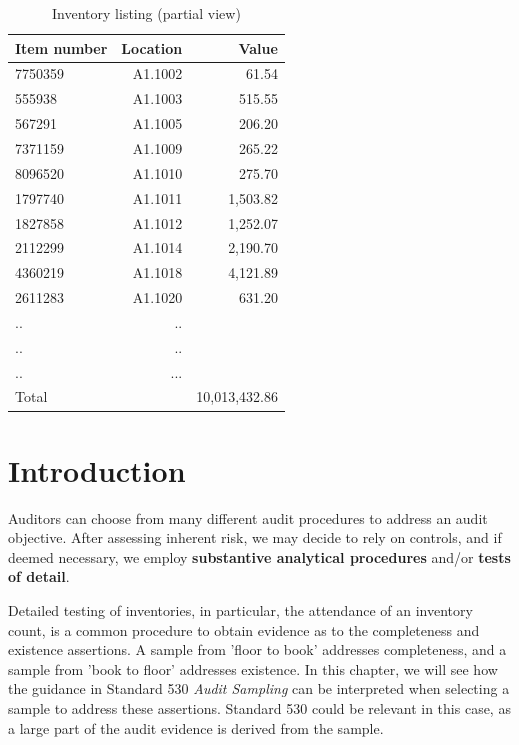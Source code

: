 \begin{table}[htbp]
\begin{tabularx}{\textwidth}{@{\extracolsep{\fill}}lrr}
\toprule

Item number & \multicolumn{1}{r}{Location} & \multicolumn{1}{r}{Value} \\

\midrule

7750359 & A1.1002 & 61.54 \\
555938 & A1.1003 & 515.55 \\ 
567291 & A1.1005 & 206.20 \\
7371159 & A1.1009 & 265.22 \\
8096520 & A1.1010 & 275.70 \\
1797740 & A1.1011 & 1,503.82 \\
1827858 & A1.1012 & 1,252.07 \\
2112299 & A1.1014 & 2,190.70 \\
4360219 & A1.1018 & 4,121.89 \\
2611283 & A1.1020 & 631.20 \\
.. & .. \\
.. & .. \\
.. & ...\\

\midrule

Total & & 10,013,432.86\\

\bottomrule
\end{tabularx}
\caption{Inventory listing (partial view)}
\label{tab:inventory_listing}
\end{table}



\section{Introduction} %
\label{sec:H1_introduction}

Auditors can choose from many different audit procedures to address an audit objective. After assessing inherent risk, we may decide to rely on controls, and if deemed necessary, we employ \textbf{substantive analytical procedures} and/or \textbf{tests of detail}.

Detailed testing of inventories, in particular, the attendance of an inventory count, is a common procedure to obtain evidence as to the completeness and existence assertions. A sample from 'floor to book' addresses completeness, and a sample from 'book to floor' addresses existence. In this chapter, we will see how the guidance in Standard 530 \emph{Audit Sampling} can be interpreted when selecting a sample to address these assertions. Standard 530 could be relevant in this case, as a large part of the audit evidence is derived from the sample. 

